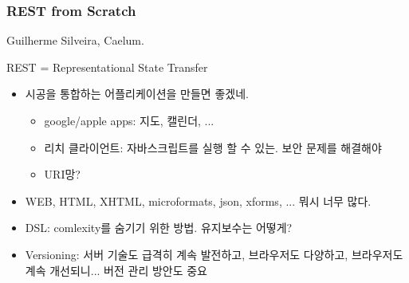 \begin{frame}
\frametitle{REST from Scratch}

Guilherme Silveira, Caelum.
 
REST = Representational State Transfer

\begin{itemize}
\item 시공을 통합하는 어플리케이션을 만들면 좋겠네.
  \begin{itemize}
  \item google/apple apps: 지도, 캘린더, ...
  \item 리치 클라이언트: 자바스크립트를 실행 할 수 있는. 보안 문제를
    해결해야
  \item URI망?
  \end{itemize}
\item  WEB, HTML, XHTML, microformats, json, xforms, ... 뭐시 너무 많다.
\item DSL: comlexity를 숨기기 위한 방법. 유지보수는 어떻게?
\item Versioning: 서버 기술도 급격히 계속 발전하고, 브라우저도
  다양하고, 브라우저도 계속 개선되니... 버전 관리 방안도 중요
\end{itemize}

\end{frame}
